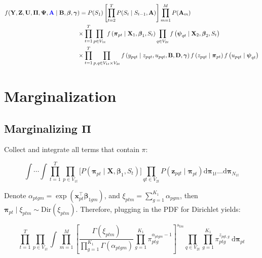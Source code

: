 \documentclass{article}
\begin{document}
\begin{equation} \label{eq1}
\begin{aligned} f(\mathbf{Y}, \mathbf{Z}, \mathbf{U}, \boldsymbol{\Pi}, \boldsymbol{\Psi}, \textcolor{blue}{\mathbf{A}} \mid \mathbf{B}, \boldsymbol{\beta}, \boldsymbol{\gamma} &)= P(S_1) \left[\prod_{t=2}^T P(S_t \mid S_{t-1}, \mathbf{A})\right]\prod_{m=1}^M P(\mathbf{A}_m) \\
& \times \prod_{t=1}^T \prod_{p \in V_{1t}} f\left(\boldsymbol{\pi}_{pt} \mid \mathbf{X}_1, \boldsymbol{\beta}_{1}, S_t \right) \prod_{q \in V_{2t}} f\left(\boldsymbol{\psi}_{qt} \mid \mathbf{X}_2, \boldsymbol{\beta}_{2}, S_t \right) 
\\
& \times \prod_{t=1}^T \prod_{p, q \in V_{1t} \times V_{2t}} f\left(y_{p q t} \mid z_{p q t}, u_{p q t}, \mathbf{B}, \mathbf{D}, \boldsymbol{\gamma} \right) f\left(z_{p q t} \mid \boldsymbol{\pi}_{pt}\right) f\left(u_{p q t} \mid \boldsymbol{\psi}_{qt}\right) 
\end{aligned}
\end{equation}

\section{Marginalization}

\subsection{Marginalizing $\boldsymbol{\Pi}$}

Collect and integrate all terms that contain $\pi$:

$$
\int \cdots \int \prod_{t=1}^T  \prod_{p \in V_{1t}}\biggl[P\left(\boldsymbol{\pi}_{pt} \mid \mathbf{X}, \boldsymbol{\beta}_1, S_t\right)\biggr] \prod_{qt \in V_{2t}} P\left(\mathbf{z}_{pqt} \mid \boldsymbol{\pi}_{pt}\right)  \mathrm{d} \boldsymbol{\pi}_{1t} \ldots \mathrm{d} \boldsymbol{\pi}_{N_{1t}}
$$

Denote $\alpha_{ptgm} = \exp \left(\mathbf{x}_{pt}^{\top}\boldsymbol{\beta}_{1gm} \right)$, and $\xi_{ptm} = \sum_{g=1}^{K_1} \alpha_{pgm}$, then $\boldsymbol{\pi}_{pt} \mid \xi_{ptm} \sim \text{Dir}(\xi_{ptm})$. Therefore, plugging in the PDF for Dirichlet yields: 

$$\prod_{t=1}^{T} \prod_{p \in V_{1t}} \int \prod_{m=1}^{M}\left[\frac{\Gamma\left(\xi_{p t m}\right)}{\prod_{g=1}^{K_1} \Gamma\left(\alpha_{p t g m}\right)} \prod_{g=1}^{K_1} \pi_{p t g}^{\alpha_{p t g m}-1}\right]^{s_{tm}} \prod_{q \in V_{2t}} \prod_{g=1}^{K_1} \pi_{p t g}^{z_{pqt, g}}  \mathrm{~d} \boldsymbol{\pi}_{p t}$$
\end{document}
